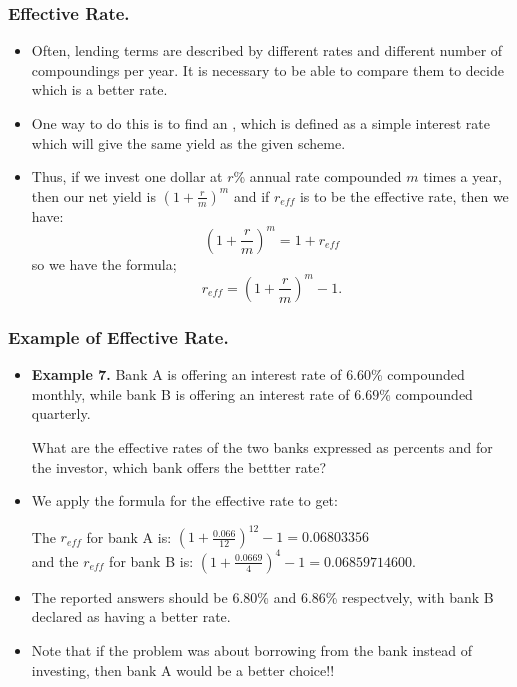 \begin{frame}%
  \frametitle{Effective Rate.}
  \begin{itemize}%
\item  Often, lending terms are described by different rates and
different number of compoundings per year. It is necessary to be able to
compare them to decide which is a better rate.

\item One way to do this is to find an ,
which is defined as a simple interest rate which will give the same
yield as the given scheme.

\item Thus, if we invest one dollar at $r$\% annual rate compounded $m$
times a year, then our net yield is $(1+\frac{r}{m})^m$ and if $r_{eff}$
is to be the effective rate, then we have:
$$\left(1+\frac{r}{m}\right)^m = 1+r_{eff} $$
so we have the formula;
$$r_{eff} = \left(1+\frac{r}{m}\right)^m -1.$$


\end{itemize}
\end{frame}

%
\begin{frame}%
  \frametitle{Example of Effective Rate.}
  \begin{itemize}%
\item {\bf Example 7.}
Bank A is offering an interest rate of $6.60$\% compounded monthly,
while bank B is offering an interest rate of $6.69$\% compounded quarterly.

What are the effective rates of the two banks expressed as percents and 
for the investor, which bank offers the bettter rate?

\item We apply the formula for the effective rate to get:

The $r_{eff}$ for bank A is:
$\left(1+\frac{0.066}{12}\right)^{12} -1 = 0.06803356$\\
and the $r_{eff}$ for bank B is:
$\left(1+\frac{0.0669}{4}\right)^{4} -1 =0.06859714600.$
\item The reported answers should be $6.80$\% and $6.86$\% respectvely,
with bank B declared as having a better rate.
\item Note that if the problem was about borrowing from the bank
instead of investing, then bank A would be a better choice!!

\end{itemize}
\end{frame}
%

